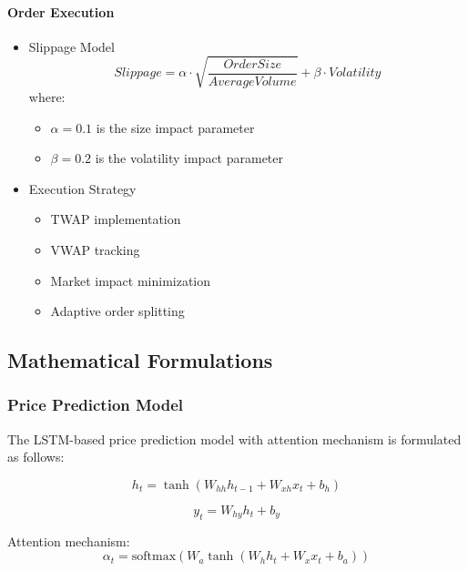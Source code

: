 \documentclass[conference]{IEEEtran}
\begin{document}
\paragraph{Order Execution}
\begin{itemize}
    \item Slippage Model
    \begin{equation}
    Slippage = \alpha \cdot \sqrt{\frac{OrderSize}{AverageVolume}} + \beta \cdot Volatility
    \end{equation}
    where:
    \begin{itemize}
        \item $\alpha = 0.1$ is the size impact parameter
        \item $\beta = 0.2$ is the volatility impact parameter
    \end{itemize}
    
    \item Execution Strategy
    \begin{itemize}
        \item TWAP implementation
        \item VWAP tracking
        \item Market impact minimization
        \item Adaptive order splitting
    \end{itemize}
\end{itemize}

\subsection{Mathematical Formulations}

\subsubsection{Price Prediction Model}
The LSTM-based price prediction model with attention mechanism is formulated as follows:

\begin{equation}
h_t = \tanh(W_{hh}h_{t-1} + W_{xh}x_t + b_h)
\end{equation}

\begin{equation}
y_t = W_{hy}h_t + b_y
\end{equation}

Attention mechanism:
\begin{equation}
\alpha_t = \text{softmax}(W_a \tanh(W_h h_t + W_x x_t + b_a))
\end{equation}
\end{document}
